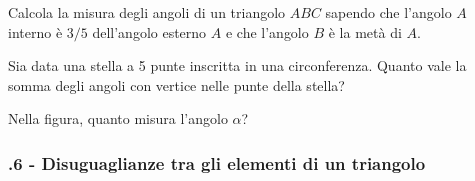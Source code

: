 \begin{multicols}{2}
\begin{esercizio}
\label{ese:3.76}
Calcola la misura degli angoli di un triangolo $ABC$ sapendo che l'angolo $A$ interno è $3/5$ dell'angolo esterno $A$ e che l'angolo $B$ è la metà di $A$.
\end{esercizio}

\begin{esercizio}
\label{ese:3.77}
Sia data una stella a 5 punte inscritta in una circonferenza. Quanto vale la somma degli angoli con vertice nelle punte della stella? 
\end{esercizio}

\begin{esercizio}
\label{ese:3.78}
Nella figura, quanto misura l'angolo $\alpha$?  
\end{esercizio}

\end{multicols}

\subsubsection*{\thechapter.6 - Disuguaglianze tra gli elementi di un triangolo}

